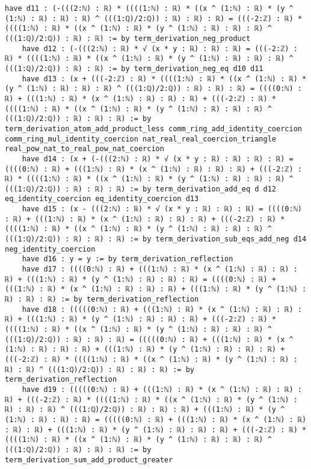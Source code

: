 \documentclass{article}
\begin{document}
\begin{tcolorbox}[colback=white!10, width=\linewidth]
\begin{lstlisting}[language=Lean4]
    have d11 : (-(((2:ℕ) : ℝ) * ((((1:ℕ) : ℝ) * ((x ^ (1:ℕ) : ℝ) * (y ^ (1:ℕ) : ℝ) : ℝ) : ℝ) ^ (((1:ℚ)/2:ℚ)) : ℝ) : ℝ) : ℝ) = (((-2:ℤ) : ℝ) * ((((1:ℕ) : ℝ) * ((x ^ (1:ℕ) : ℝ) * (y ^ (1:ℕ) : ℝ) : ℝ) : ℝ) ^ (((1:ℚ)/2:ℚ)) : ℝ) : ℝ) := by term_derivation_neg_product
    have d12 : (-(((2:ℕ) : ℝ) * √ (x * y : ℝ) : ℝ) : ℝ) = (((-2:ℤ) : ℝ) * ((((1:ℕ) : ℝ) * ((x ^ (1:ℕ) : ℝ) * (y ^ (1:ℕ) : ℝ) : ℝ) : ℝ) ^ (((1:ℚ)/2:ℚ)) : ℝ) : ℝ) := by term_derivation_neg_eq d10 d11
    have d13 : (x + (((-2:ℤ) : ℝ) * ((((1:ℕ) : ℝ) * ((x ^ (1:ℕ) : ℝ) * (y ^ (1:ℕ) : ℝ) : ℝ) : ℝ) ^ (((1:ℚ)/2:ℚ)) : ℝ) : ℝ) : ℝ) = ((((0:ℕ) : ℝ) + (((1:ℕ) : ℝ) * (x ^ (1:ℕ) : ℝ) : ℝ) : ℝ) + (((-2:ℤ) : ℝ) * ((((1:ℕ) : ℝ) * ((x ^ (1:ℕ) : ℝ) * (y ^ (1:ℕ) : ℝ) : ℝ) : ℝ) ^ (((1:ℚ)/2:ℚ)) : ℝ) : ℝ) : ℝ) := by term_derivation_atom_add_product_less comm_ring_add_identity_coercion comm_ring_mul_identity_coercion nat_real_real_coercion_triangle real_pow_nat_to_real_pow_nat_coercion
    have d14 : (x + (-(((2:ℕ) : ℝ) * √ (x * y : ℝ) : ℝ) : ℝ) : ℝ) = ((((0:ℕ) : ℝ) + (((1:ℕ) : ℝ) * (x ^ (1:ℕ) : ℝ) : ℝ) : ℝ) + (((-2:ℤ) : ℝ) * ((((1:ℕ) : ℝ) * ((x ^ (1:ℕ) : ℝ) * (y ^ (1:ℕ) : ℝ) : ℝ) : ℝ) ^ (((1:ℚ)/2:ℚ)) : ℝ) : ℝ) : ℝ) := by term_derivation_add_eq d d12 eq_identity_coercion eq_identity_coercion d13
    have d15 : (x - (((2:ℕ) : ℝ) * √ (x * y : ℝ) : ℝ) : ℝ) = ((((0:ℕ) : ℝ) + (((1:ℕ) : ℝ) * (x ^ (1:ℕ) : ℝ) : ℝ) : ℝ) + (((-2:ℤ) : ℝ) * ((((1:ℕ) : ℝ) * ((x ^ (1:ℕ) : ℝ) * (y ^ (1:ℕ) : ℝ) : ℝ) : ℝ) ^ (((1:ℚ)/2:ℚ)) : ℝ) : ℝ) : ℝ) := by term_derivation_sub_eqs_add_neg d14 neg_identity_coercion
    have d16 : y = y := by term_derivation_reflection
    have d17 : ((((0:ℕ) : ℝ) + (((1:ℕ) : ℝ) * (x ^ (1:ℕ) : ℝ) : ℝ) : ℝ) + (((1:ℕ) : ℝ) * (y ^ (1:ℕ) : ℝ) : ℝ) : ℝ) = ((((0:ℕ) : ℝ) + (((1:ℕ) : ℝ) * (x ^ (1:ℕ) : ℝ) : ℝ) : ℝ) + (((1:ℕ) : ℝ) * (y ^ (1:ℕ) : ℝ) : ℝ) : ℝ) := by term_derivation_reflection
    have d18 : (((((0:ℕ) : ℝ) + (((1:ℕ) : ℝ) * (x ^ (1:ℕ) : ℝ) : ℝ) : ℝ) + (((1:ℕ) : ℝ) * (y ^ (1:ℕ) : ℝ) : ℝ) : ℝ) + (((-2:ℤ) : ℝ) * ((((1:ℕ) : ℝ) * ((x ^ (1:ℕ) : ℝ) * (y ^ (1:ℕ) : ℝ) : ℝ) : ℝ) ^ (((1:ℚ)/2:ℚ)) : ℝ) : ℝ) : ℝ) = (((((0:ℕ) : ℝ) + (((1:ℕ) : ℝ) * (x ^ (1:ℕ) : ℝ) : ℝ) : ℝ) + (((1:ℕ) : ℝ) * (y ^ (1:ℕ) : ℝ) : ℝ) : ℝ) + (((-2:ℤ) : ℝ) * ((((1:ℕ) : ℝ) * ((x ^ (1:ℕ) : ℝ) * (y ^ (1:ℕ) : ℝ) : ℝ) : ℝ) ^ (((1:ℚ)/2:ℚ)) : ℝ) : ℝ) : ℝ) := by term_derivation_reflection
    have d19 : (((((0:ℕ) : ℝ) + (((1:ℕ) : ℝ) * (x ^ (1:ℕ) : ℝ) : ℝ) : ℝ) + (((-2:ℤ) : ℝ) * ((((1:ℕ) : ℝ) * ((x ^ (1:ℕ) : ℝ) * (y ^ (1:ℕ) : ℝ) : ℝ) : ℝ) ^ (((1:ℚ)/2:ℚ)) : ℝ) : ℝ) : ℝ) + (((1:ℕ) : ℝ) * (y ^ (1:ℕ) : ℝ) : ℝ) : ℝ) = (((((0:ℕ) : ℝ) + (((1:ℕ) : ℝ) * (x ^ (1:ℕ) : ℝ) : ℝ) : ℝ) + (((1:ℕ) : ℝ) * (y ^ (1:ℕ) : ℝ) : ℝ) : ℝ) + (((-2:ℤ) : ℝ) * ((((1:ℕ) : ℝ) * ((x ^ (1:ℕ) : ℝ) * (y ^ (1:ℕ) : ℝ) : ℝ) : ℝ) ^ (((1:ℚ)/2:ℚ)) : ℝ) : ℝ) : ℝ) := by term_derivation_sum_add_product_greater

\end{lstlisting}
\end{tcolorbox}
\end{document}
